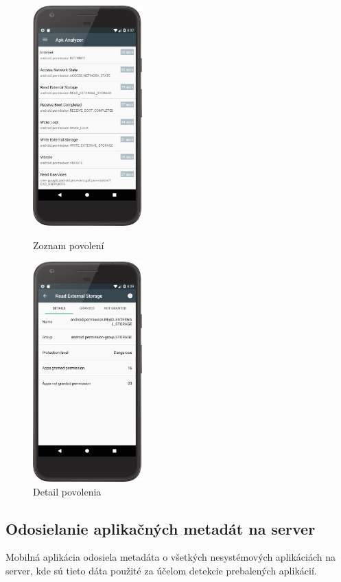 \begin{figure}[H]
\begin{minipage}[t][][b]{0.5\textwidth}
\centering
    \includegraphics[width=4.2cm]{images/app/list_permissions_device.png}
\centering
\caption{Zoznam povolení}
\label{fig:permission-list}
\end{minipage}%
\hfill
\centering
\begin{minipage}[t][][b]{0.5\textwidth}
\centering
    \includegraphics[width=4.2cm]{images/app/permission_detail_device.png}
\centering
\caption{Detail povolenia}
\label{fig:permission-detail}
\end{minipage}%
\end{figure}


\subsection{Odosielanie aplikačných metadát na server}
Mobilná aplikácia odosiela metadáta o všetkých nesystémových aplikáciách na server, kde sú tieto dáta použité za účelom detekcie prebalených aplikácií.

